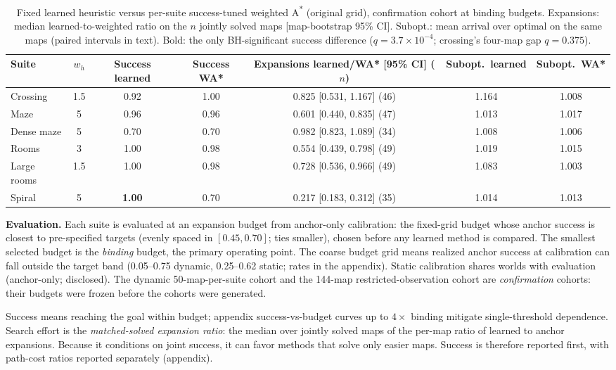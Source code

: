 \documentclass[letterpaper]{article} %
\begin{document}
\begin{table}[t]
\centering
\small
\begin{tabular}{lcccccc}
\toprule
Suite & $w_h$ & Success learned & Success WA* & Expansions learned/WA* [95\% CI] ($n$) & Subopt.\ learned & Subopt.\ WA* \\
\midrule
Crossing & 1.5 & 0.92 & 1.00 & 0.825 [0.531, 1.167] (46) & 1.164 & 1.008 \\
Maze & 5 & 0.96 & 0.96 & 0.601 [0.440, 0.835] (47) & 1.013 & 1.017 \\
Dense maze & 5 & 0.70 & 0.70 & 0.982 [0.823, 1.089] (34) & 1.008 & 1.006 \\
Rooms & 3 & 1.00 & 0.98 & 0.554 [0.439, 0.798] (49) & 1.019 & 1.015 \\
Large rooms & 1.5 & 1.00 & 0.98 & 0.728 [0.536, 0.966] (49) & 1.083 & 1.003 \\
Spiral & 5 & \textbf{1.00} & 0.70 & 0.217 [0.183, 0.312] (35) & 1.014 & 1.013 \\
\bottomrule
\end{tabular}
\caption{Fixed learned heuristic versus per-suite success-tuned weighted A\textsuperscript{*} (original grid), confirmation cohort at binding budgets. Expansions: median learned-to-weighted ratio on the $n$ jointly solved maps [map-bootstrap 95\% CI]. Subopt.: mean arrival over optimal on the same maps (paired intervals in text). Bold: the only BH-significant success difference ($q{=}3.7\times10^{-4}$; crossing's four-map gap $q{=}0.375$).}
\label{tab:wastar-main}
\end{table}

\textbf{Evaluation.} Each suite is evaluated at an expansion budget from anchor-only calibration: the fixed-grid budget whose anchor success is closest to pre-specified targets (evenly spaced in $[0.45, 0.70]$; ties smaller), chosen before any learned method is compared. The smallest selected budget is the \emph{binding} budget, the primary operating point. The coarse budget grid means realized anchor success at calibration can fall outside the target band (0.05--0.75 dynamic, 0.25--0.62 static; rates in the appendix). Static calibration shares worlds with evaluation (anchor-only; disclosed). The dynamic 50-map-per-suite cohort and the 144-map restricted-observation cohort are \emph{confirmation} cohorts: their budgets were frozen before the cohorts were generated.

Success means reaching the goal within budget; appendix success-vs-budget curves up to $4\times$ binding mitigate single-threshold dependence. Search effort is the \emph{matched-solved expansion ratio}: the median over jointly solved maps of the per-map ratio of learned to anchor expansions. Because it conditions on joint success, it can favor methods that solve only easier maps. Success is therefore reported first, with path-cost ratios reported separately (appendix).
\end{document}
